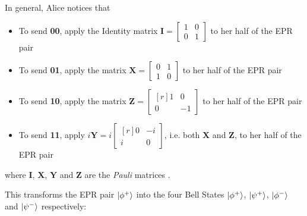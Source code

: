 \documentclass{article}
\theoremstyle{definition}
\begin{document}
\bigskip
\noindent
In general, Alice notices that 

\begin{itemize}
\item To send \textbf{00}, apply the Identity matrix $\mathbf{I}
= \begin{bmatrix} 1 & 0 \\ 0 & 1 \end{bmatrix}$ to her half of
the EPR pair 
\item To send \textbf{01}, apply the matrix $\mathbf{X}
= \begin{bmatrix} 0 & 1 \\ 1 & 0 \end{bmatrix}$ to her half of
the EPR pair 
\item To send \textbf{10}, apply the matrix $\mathbf{Z}
= \begin{bmatrix}[r] 1 & 0 \\ 0 & -1 \end{bmatrix}$ to her half
of the EPR pair 
\item To send \textbf{11}, apply $i\mathbf{Y} =
i \begin{bmatrix}[r] 0 & -i \\ i & 0 \end{bmatrix}$, i.e. both
$\mathbf{X}$ and $\mathbf{Z}$,  to her half of the EPR pair 
\end{itemize} 

\bigskip
\noindent
where $\mathbf{I}$, $\mathbf{X}$, $\mathbf{Y}$ and $\mathbf{Z}$
are the \emph{Pauli} matrices \cite{wiki:pauli_matrices}.

\bigskip
\noindent
This transforms the EPR pair $\ket{\phi^+}$ into the four Bell
States $\ket{\phi^+}$, $\ket{\psi^+}$, $\ket{\phi^-}$ and
$\ket{\psi^-}$ respectively: 
\end{document}
